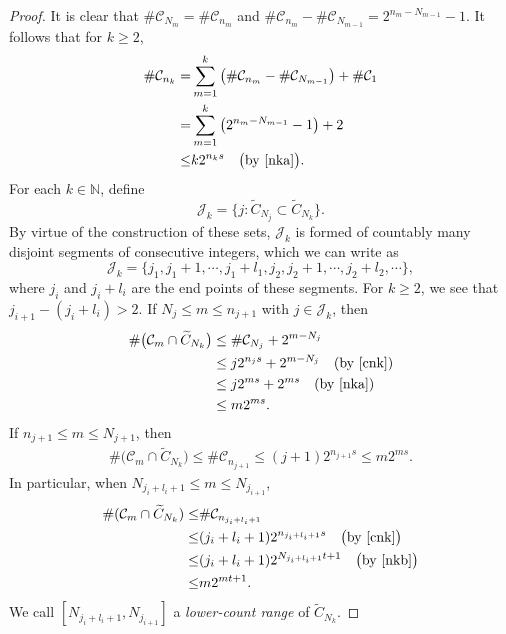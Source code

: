 \documentclass[12pt]{article}
\newcommand{\1}{{\bf 1}}
\begin{document}
\begin{proof}
		It is clear that $\#\mathcal{C}_{N_m}=\#\mathcal{C}_{n_m}$ and $\#\mathcal{C}_{n_m}-\#\mathcal{C}_{N_{m-1}}=2^{{n_m}-N_{m-1}}-1$. It follows that for $k\geq2$,
		\begin{align}
			\#\mathcal{C}_{n_k}=&\sum_{m=1}^k\big(\#\mathcal{C}_{n_m}-\#\mathcal{C}_{N_{m-1}}\big)+\#\mathcal{C}_{1}\notag\\
			=&\sum_{m=1}^k\big(2^{{n_m}-N_{m-1}}-1\big)+2\notag\\
			\leq&k2^{n_ks}\quad\text{\big(by \eqref{nka}\big)}.\label{cnk}
		\end{align}
		For each $k\in\mathbb{N}$, define
		\begin{equation*}
			\mathcal{J}_k=\big\{j:\widetilde{C}_{N_j}\subset  \widetilde{C}_{N_k}\big\}.
		\end{equation*}
		By virtue of the construction of these sets,  $\mathcal{J}_k$   is formed of  countably many  disjoint segments of consecutive integers, which we can  write as 
		\begin{equation*}
			\mathcal{J}_k=\{{j_1},j_1+1,\cdots,j_1+l_1, j_2,j_2+1,\cdots,j_2+l_2,\cdots\},
		\end{equation*}
		where $j_i$ and $j_i+l_i$ are the end points of these segments. For $k\geq2$, we see that $j_{i+1}-(j_i+l_i)>2$.
		If $N_j\leq m\leq n_{j+1}$ with $j\in\mathcal{J}_k$, then
		\begin{align}\label{m1}
		\#\big(\mathcal{C}_m\cap \widetilde{C}_{N_k}\big)&\leq\#\mathcal{C}_{N_j}+2^{m-N_j}\notag\\
		&\leq j2^{n_js}+2^{m-N_j}\quad (\text{by \eqref{cnk}})\notag\\
		&\leq j2^{ms}+2^{ms}\quad (\text{by \eqref{nka}})\notag\\
		&\leq m 2^{ms}.
		\end{align}
		If $n_{j+1}\leq m\leq N_{j+1}$, then 
		\begin{align}\label{m2}
			\#\big(\mathcal{C}_{m}\cap \widetilde{C}_{N_k}\big)
			\leq\#\mathcal{C}_{n_{j+1}}\leq(j+1)2^{n_{j+1}s}
				\leq m2^{ms}.
		\end{align}
		 In particular, when $N_{j_i+l_i+1}\leq m\leq N_{j_{i+1}}$, 
		\begin{align}\label{less}
			\#(\mathcal{C}_m\cap\widetilde{C}_{N_k} )\leq&		\#\mathcal{C}_{n_{j_i+l_i+1}}\notag\\
		\leq&(j_i+l_i+1)2^{n_{j_i+l_i+1}s}\quad\text{\big(by \eqref{cnk}\big)}\notag\\
		\leq& (j_i+l_i+1)2^{N_{j_i+l_i+1}t+1}\quad\text{\big(by \eqref{nkb}\big)}\notag\\
		\leq& m2^{mt+1}.
		\end{align}
		We call $[N_{j_i+l_i+1},N_{j_{i+1}}]$ a {\it lower-count range}  of $\widetilde{C}_{N_k}$.
		

\end{proof}
\end{document}
